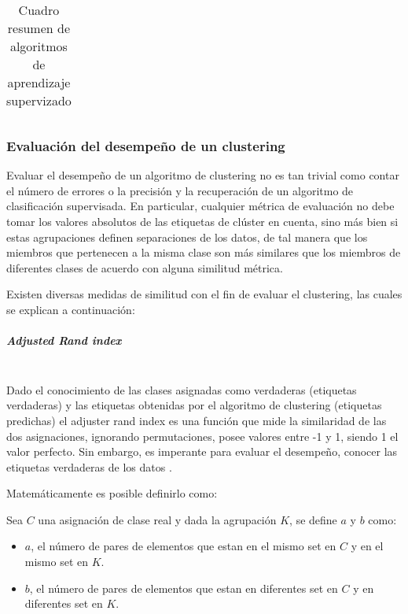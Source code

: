 \begin{table}[]
\begin{tabular}{|l|l|l|l|l|}
	\end{tabular}
	
	
	\caption{Cuadro resumen de algoritmos de aprendizaje supervizado}
	\label{cuadroResumen}
\end{table}

\subsubsection{Evaluación del desempeño de un clustering}\label{evaluacion}

Evaluar el desempeño de un algoritmo de clustering no es tan trivial como contar el número de errores o la precisión y la recuperación de un algoritmo de clasificación supervisada. En particular, cualquier métrica de evaluación no debe tomar los valores absolutos de las etiquetas de clúster en cuenta, sino más bien si estas agrupaciones definen separaciones de los datos, de tal manera que los miembros que pertenecen a la misma clase son más similares que los miembros de diferentes clases de acuerdo con alguna similitud métrica.

Existen diversas medidas de similitud con el fin de evaluar el clustering, las cuales se explican a continuación:

\subparagraph{Adjusted Rand index\\\\}

Dado el conocimiento de las clases asignadas como verdaderas (etiquetas verdaderas) y las etiquetas obtenidas por el algoritmo de clustering (etiquetas predichas) el adjuster rand index es una función que mide la similaridad de las dos asignaciones, ignorando permutaciones, posee valores entre -1 y 1, siendo 1 el valor perfecto. Sin embargo, es imperante para evaluar el desempeño, conocer las etiquetas verdaderas de los datos \cite{yeung2001details}.

Matemáticamente es posible definirlo como:

Sea $C$ una asignación de clase real y dada la agrupación $K$, se define $a$ y $b$ como:

\begin{itemize}
	
	\item $a$, el número de pares de elementos que estan en el mismo set en $C$ y en el mismo set en $K$.
	\item $b$, el número de pares de elementos que estan en diferentes set en $C$ y en diferentes set en $K$.
\end{itemize}

